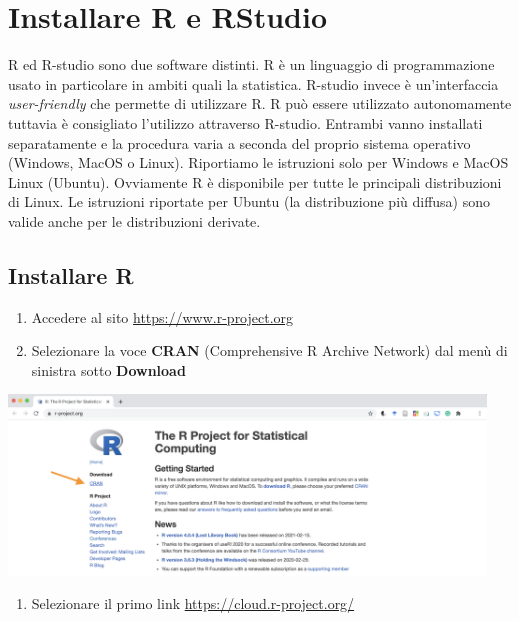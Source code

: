 \documentclass[
]{book}
\providecommand{\tightlist}{%
  \setlength{\itemsep}{0pt}\setlength{\parskip}{0pt}}
\begin{document}
\hypertarget{install}{%
\chapter{Installare R e RStudio}\label{install}}

R ed R-studio sono due software distinti. R è un linguaggio di programmazione usato in particolare in ambiti quali la statistica. R-studio invece è un'interfaccia \emph{user-friendly} che permette di utilizzare R.
R può essere utilizzato autonomamente tuttavia è consigliato l'utilizzo attraverso R-studio. Entrambi vanno installati separatamente e la procedura varia a seconda del proprio sistema operativo (Windows, MacOS o Linux). Riportiamo le istruzioni solo per Windows e MacOS Linux (Ubuntu). Ovviamente R è disponibile per tutte le principali distribuzioni di Linux. Le istruzioni riportate per Ubuntu (la distribuzione più diffusa) sono valide anche per le distribuzioni derivate.

\hypertarget{installare-r}{%
\section{Installare R}\label{installare-r}}

\begin{enumerate}
\def\labelenumi{\arabic{enumi}.}
\tightlist
\item
  Accedere al sito \url{https://www.r-project.org}
\item
  Selezionare la voce \textbf{CRAN} (Comprehensive R Archive Network) dal menù di sinistra sotto \textbf{Download}
\end{enumerate}

\includegraphics[width=0.95\textwidth,height=\textheight]{images/install_CRAN.png}

\begin{enumerate}
\def\labelenumi{\arabic{enumi}.}
\setcounter{enumi}{2}
\tightlist
\item
  Selezionare il primo link \url{https://cloud.r-project.org/}
\end{enumerate}
\end{document}
